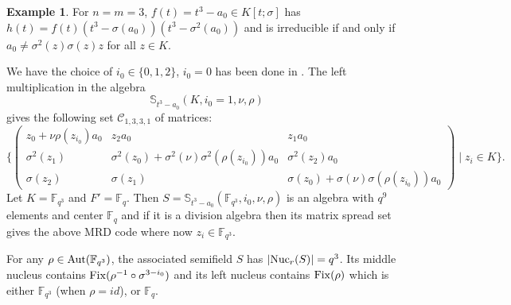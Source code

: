 \documentclass[12pt]{amsart}
\theoremstyle{plain}
\theoremstyle{definition}
\newtheorem{example}[theorem]{Example}
\numberwithin{equation}{section}
\numberwithin{figure}{section}
\begin{document}
\begin{example}
 For $n=m=3$,  $f(t) = t^3-a_0\in K[t;\sigma]$  has $h(t)=f(t)(t^3-\sigma(a_0 ))(t^3-\sigma^2(a_0 ))$
  and is irreducible if and only if $a_0 \not=\sigma^{2}(z)\sigma(z)z$ for all $z\in K$.

  We have the choice of ${i_0}\in \{ 0,1,2\}$, $i_0=0$ has been done in \cite[Section 4.2]{Sheekey}. The left multiplication in the algebra
  $$\mathbb{S}_{t^3-a_0}(K,i_0=1,\nu,\rho)$$
   gives the following set $\mathcal{C}_{1,3,3,1}$ of matrices:
 $$\Big\{
 \left( \begin{array}{ccc}
z_0+\nu\rho(z_{i_0})a_0&       z_2      a_0                                       &   z_1 a_0\\
\sigma^2(z_1)      &     \sigma^2(z_0)+ \sigma^2(\nu)\sigma^2(\rho(z_{i_0})) a_0  &   \sigma^2(z_2)a_0 \\
\sigma(z_2)        &      \sigma(z_1)                                         & \sigma(z_0)+ \sigma(\nu)\sigma(\rho(z_{i_0})) a_0
\end{array} \right)
\mid z_i\in K
\Big\}.
$$
Let $K=\mathbb{F}_{q^3}$ and $F'=\mathbb{F}_q$.  Then $S= \mathbb{S}_{t^3-a_0}(\mathbb{F}_{q^3},i_0,\nu,\rho)$ is an algebra with $q^9$ elements and center $\mathbb{F}_q$
and if it is a division algebra then  its matrix spread set gives the above MRD code where now $z_i\in \mathbb{F}_{q^3}$.

For any $\rho\in {\rm Aut}(\mathbb{F}_{q^3})$, the associated semifield $S$ has
$|{\rm Nuc}_r (S)|=q^3$. Its middle nucleus contains ${\rm Fix}(\rho^{-1}\circ \sigma^{3-i_0})$
and its left nucleus contains ${\rm Fix}(\rho)$ which is either $\mathbb{F}_{q^3}$ (when $\rho=id$), or $\mathbb{F}_{q}$.


\end{example}
\end{document}
